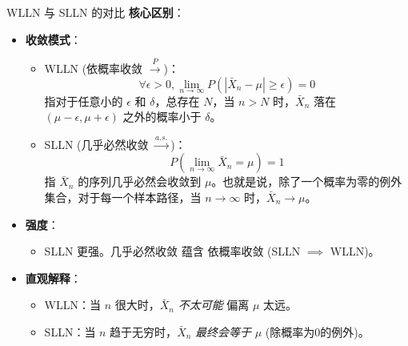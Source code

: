 \documentclass[UTF8]{beamer} %
\begin{document}
\begin{frame}{WLLN 与 SLLN 的对比}
    \textbf{核心区别}：
    \begin{itemize}
        \item \textbf{收敛模式}：
            \begin{itemize}
                \item WLLN (依概率收敛 \( \xrightarrow{P} \))：
                \[ \forall \epsilon > 0, \lim_{n \to \infty} P(|\bar{X}_n - \mu| \geq \epsilon) = 0 \]
                指对于任意小的 $\epsilon$ 和 $\delta$，总存在 $N$，当 $n > N$ 时，$\bar{X}_n$ 落在 $(\mu-\epsilon, \mu+\epsilon)$ \alert{之外的概率小于 $\delta$}。
                \pause
                \item SLLN (几乎必然收敛 \( \xrightarrow{a.s.} \))：
                \[ P\left( \lim_{n \to \infty} \bar{X}_n = \mu \right) = 1 \]
                指 $\bar{X}_n$ 的序列\alert{几乎必然会收敛到 $\mu$}。也就是说，除了一个概率为零的例外集合，对于每一个样本路径，当 $n \to \infty$ 时，$\bar{X}_n \to \mu$。
            \end{itemize}
        \pause
        \item \textbf{强度}：
            \begin{itemize}
                \item SLLN \alert{更强}。几乎必然收敛 \alert{蕴含} 依概率收敛 (SLLN $\implies$ WLLN)。
            \end{itemize}
        \pause
        \item \textbf{直观解释}：
            \begin{itemize}
                \item WLLN：当 $n$ 很大时，$\bar{X}_n$ \textit{不太可能} 偏离 $\mu$ 太远。
                \item SLLN：当 $n$ 趋于无穷时，$\bar{X}_n$ \textit{最终会等于} $\mu$ (除概率为0的例外)。
            \end{itemize}
        \end{itemize}
\end{frame}
\end{document}
